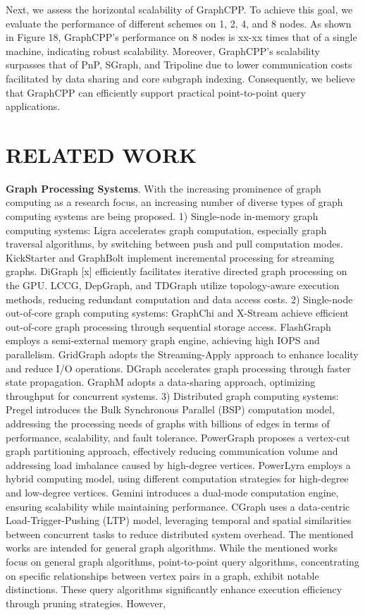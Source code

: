 \documentclass[lettersize,journal]{IEEEtran} %
\begin{document}
Next, we assess the horizontal scalability of GraphCPP. To achieve this goal, we evaluate the performance of different schemes on 1, 2, 4, and 8 nodes. As shown in Figure 18, GraphCPP's performance on 8 nodes is xx-xx times that of a single machine, indicating robust scalability. Moreover, GraphCPP's scalability surpasses that of PnP\cite{pnp}, SGraph\cite{sgraph}, and Tripoline\cite{tripoline} due to lower communication costs facilitated by data sharing and core subgraph indexing. Consequently, we believe that GraphCPP can efficiently support practical point-to-point query applications.

\section{RELATED WORK}
{\bf{Graph Processing Systems}}. With the increasing prominence of graph computing as a research focus, an increasing number of diverse types of graph computing systems are being proposed. 1) Single-node in-memory graph computing systems: Ligra\cite{ligra} accelerates graph computation, especially graph traversal algorithms, by switching between push and pull computation modes. KickStarter\cite{kickstarter} and GraphBolt\cite{graphbolt} implement incremental processing for streaming graphs. DiGraph [x] efficiently facilitates iterative directed graph processing on the GPU. LCCG\cite{lccg}, DepGraph\cite{depgraph}, and TDGraph\cite{tdgraph} utilize topology-aware execution methods, reducing redundant computation and data access costs. 2) Single-node out-of-core graph computing systems: GraphChi\cite{graphchi} and X-Stream\cite{x-stream} achieve efficient out-of-core graph processing through sequential storage access. FlashGraph\cite{flashgraph} employs a semi-external memory graph engine, achieving high IOPS and parallelism. GridGraph\cite{gridgraph} adopts the Streaming-Apply approach to enhance locality and reduce I/O operations. DGraph\cite{efficient} accelerates graph processing through faster state propagation. GraphM\cite{graphm} adopts a data-sharing approach, optimizing throughput for concurrent systems. 3) Distributed graph computing systems: Pregel\cite{pregel} introduces the Bulk Synchronous Parallel (BSP) computation model, addressing the processing needs of graphs with billions of edges in terms of performance, scalability, and fault tolerance. PowerGraph\cite{powergraph} proposes a vertex-cut graph partitioning approach, effectively reducing communication volume and addressing load imbalance caused by high-degree vertices. PowerLyra\cite{powerlyra} employs a hybrid computing model, using different computation strategies for high-degree and low-degree vertices. Gemini\cite{gemini} introduces a dual-mode computation engine, ensuring scalability while maintaining performance. CGraph\cite{cgraph} uses a data-centric Load-Trigger-Pushing (LTP) model, leveraging temporal and spatial similarities between concurrent tasks to reduce distributed system overhead. The mentioned works are intended for general graph algorithms. While the mentioned works focus on general graph algorithms, point-to-point query algorithms, concentrating on specific relationships between vertex pairs in a graph, exhibit notable distinctions. These query algorithms significantly enhance execution efficiency through pruning strategies. However, 
\end{document}
